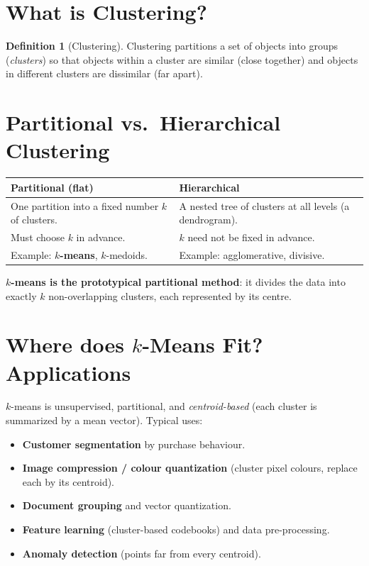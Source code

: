 \documentclass[11pt,a4paper]{report}
\theoremstyle{definition}
\newtheorem{definition}{Definition}[chapter]
\theoremstyle{plain}
\theoremstyle{remark}
\begin{document}
	\section{What is Clustering?}
	\begin{definition}[Clustering]
		Clustering partitions a set of objects into groups (\emph{clusters}) so that
		objects within a cluster are similar (close together) and objects in different
		clusters are dissimilar (far apart).
	\end{definition}
	
	\section{Partitional vs.\ Hierarchical Clustering}
	\begin{center}
		\begin{tabular}{@{}p{6.4cm}p{6.4cm}@{}}
			\toprule
			\textbf{Partitional (flat)} & \textbf{Hierarchical}\\
			\midrule
			One partition into a fixed number $k$ of clusters. & A nested tree of clusters
			at all levels (a dendrogram).\\
			Must choose $k$ in advance. & $k$ need not be fixed in advance.\\
			Example: \textbf{$k$-means}, $k$-medoids. & Example: agglomerative, divisive.\\
			\bottomrule
		\end{tabular}
	\end{center}
	\textbf{$k$-means is the prototypical partitional method}: it divides the data
	into exactly $k$ non-overlapping clusters, each represented by its centre.
	
	\section{Where does $k$-Means Fit? Applications}
	$k$-means is unsupervised, partitional, and \emph{centroid-based} (each cluster
	is summarized by a mean vector). Typical uses:
	\begin{itemize}[nosep]
		\item \textbf{Customer segmentation} by purchase behaviour.
		\item \textbf{Image compression / colour quantization} (cluster pixel colours,
		replace each by its centroid).
		\item \textbf{Document grouping} and vector quantization.
		\item \textbf{Feature learning} (cluster-based codebooks) and data
		pre-processing.
		\item \textbf{Anomaly detection} (points far from every centroid).
	\end{itemize}
	
\end{document}
